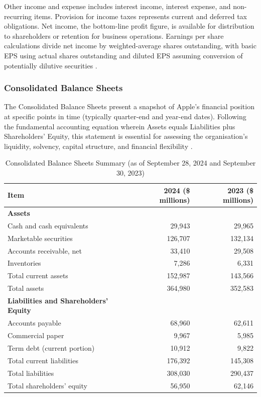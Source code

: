\documentclass[12pt,a4paper]{article}
\begin{document}
Other income and expense includes interest income, interest expense, and non-recurring items. Provision for income taxes represents current and deferred tax obligations. Net income, the bottom-line profit figure, is available for distribution to shareholders or retention for business operations. Earnings per share calculations divide net income by weighted-average shares outstanding, with basic EPS using actual shares outstanding and diluted EPS assuming conversion of potentially dilutive securities \citep{kieso2023}.

\subsubsection{Consolidated Balance Sheets}

The Consolidated Balance Sheets present a snapshot of Apple's financial position at specific points in time (typically quarter-end and year-end dates). Following the fundamental accounting equation wherein Assets equals Liabilities plus Shareholders' Equity, this statement is essential for assessing the organisation's liquidity, solvency, capital structure, and financial flexibility \citep{kieso2023}.

\begin{table}[H]
\centering
\caption{Consolidated Balance Sheets Summary (as of September 28, 2024 and September 30, 2023)}
\label{tab:balance_sheet_summary}
\begin{tabular}{lrr}
\toprule
\textbf{Item} & \textbf{2024 (\$ millions)} & \textbf{2023 (\$ millions)} \\
\midrule
\textbf{Assets} \\
Cash and cash equivalents & 29,943 & 29,965 \\
Marketable securities & 126,707 & 132,134 \\
Accounts receivable, net & 33,410 & 29,508 \\
Inventories & 7,286 & 6,331 \\
Total current assets & 152,987 & 143,566 \\
Total assets & 364,980 & 352,583 \\
\midrule
\textbf{Liabilities and Shareholders' Equity} \\
Accounts payable & 68,960 & 62,611 \\
Commercial paper & 9,967 & 5,985 \\
Term debt (current portion) & 10,912 & 9,822 \\
Total current liabilities & 176,392 & 145,308 \\
Total liabilities & 308,030 & 290,437 \\
Total shareholders' equity & 56,950 & 62,146 \\
\bottomrule
\end{tabular}
\end{table}
\end{document}
